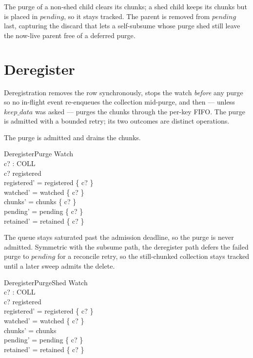 \documentclass[a4paper]{article}
\begin{document}
The purge of a non-shed child clears its chunks; a shed child keeps its chunks
but is placed in $pending$, so it stays tracked.  The parent is removed from
$pending$ last, capturing the discard that lets a self-subsume whose purge shed
still leave the now-live parent free of a deferred purge.

\section{Deregister}

Deregistration removes the row synchronously, stops the watch \textit{before}
any purge so no in-flight event re-enqueues the collection mid-purge, and then
--- unless $keep\_data$ was asked --- purges the chunks through the per-key
FIFO.  The purge is admitted with a bounded retry; its two outcomes are distinct
operations.

The purge is admitted and drains the chunks.

\begin{schema}{DeregisterPurge}
  \Delta Watch \\
  c? : COLL \\
  \where
  c? \in registered \\
  registered' = registered \setminus \{ c? \} \\
  watched' = watched \setminus \{ c? \} \\
  chunks' = chunks \setminus \{ c? \} \\
  pending' = pending \setminus \{ c? \} \\
  retained' = retained \setminus \{ c? \}
\end{schema}

The queue stays saturated past the admission deadline, so the purge is never
admitted.  Symmetric with the subsume path, the deregister path defers the
failed purge to $pending$ for a reconcile retry, so the still-chunked collection
stays tracked until a later sweep admits the delete.

\begin{schema}{DeregisterPurgeShed}
  \Delta Watch \\
  c? : COLL \\
  \where
  c? \in registered \\
  registered' = registered \setminus \{ c? \} \\
  watched' = watched \setminus \{ c? \} \\
  chunks' = chunks \\
  pending' = pending \cup \{ c? \} \\
  retained' = retained \setminus \{ c? \}
\end{schema}
\end{document}
